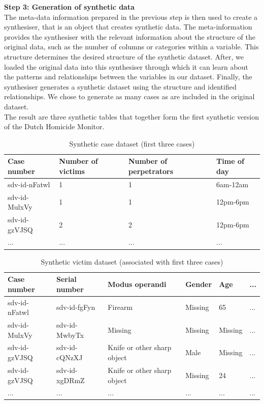 \textbf{Step 3: Generation of synthetic data} \\
The meta-data information prepared in the previous step is then used to create a synthesiser, that is an object that creates synthetic data. The meta-information provides the synthesiser with the relevant information about the structure of the original data, such as the number of columns or categories within a variable. This structure determines the desired structure of the synthetic dataset. After, we loaded the original data into this synthesiser through which it can learn about the patterns and relationships between the variables in our dataset. Finally, the synthesiser generates a synthetic dataset using the structure and identified relationships. We chose to generate as many cases as are included in the original dataset. \\

The result are three synthetic tables that together form the first synthetic version of the Dutch Homicide Monitor.

\vspace{10pt}
\begin{table}[]
\small
\begin{tabular}{@{}llll@{}}
\midrule
Case number   & Number of victims & Number of perpetrators & Time of day \\ \midrule
sdv-id-nFatwl & 1                 & 1                      & 6am-12am    \\
sdv-id-MulxVy & 1                 & 1                      & 12pm-6pm    \\
sdv-id-gzVJSQ & 2                 & 2                      & 12pm-6pm    \\
...           & ...               & ...                    & ...    \\ \bottomrule    
\end{tabular}
\caption{Synthetic case dataset (first three cases)}
\label{tab:my-table}
\end{table}
\vspace{5pt}

\begin{table}[]
\small
\begin{tabular}{@{}llllll@{}}
\toprule
Case number   & Serial number & Modus operandi              & Gender  & Age     & ... \\ \midrule
sdv-id-nFatwl & sdv-id-fgFyn  & Firearm                     & Missing & 65      & ... \\
sdv-id-MulxVy & sdv-id-MwbyTx & Missing                     & Missing & Missing & ... \\
sdv-id-gzVJSQ & sdv-id-cQNzXJ & Knife or other sharp object & Male    & Missing & ... \\
sdv-id-gzVJSQ & sdv-id-xgDRmZ & Knife or other sharp object & Missing & 24      & ... \\
...           & ...           & ...                         & ...     & ...     & ... \\ \bottomrule
\end{tabular}
\caption{Synthetic victim dataset (associated with first three cases)}
\label{tab:my-table}
\end{table}

